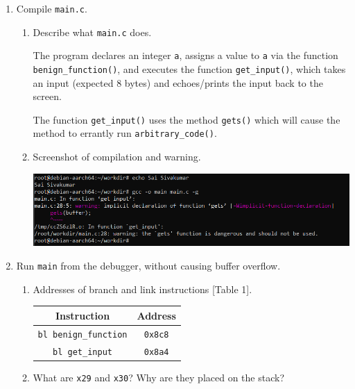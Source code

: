 \documentclass[11pt]{article}
\newcommand{\fn}[1]{\texttt{#1}}
\begin{document}
\begin{enumerate}[left = \parindent, label=\textbf{Task \arabic* -}]
    \item Compile \fn{main.c}. \begin{enumerate}
        \item Describe what \fn{main.c} does.
        
        The program declares an integer \fn a, assigns a value to \fn a via the function \fn{benign\_function()}, and executes the function \fn{get\_input()}, which takes an input (expected $8$ bytes) and echoes/prints the input back to the screen.

        The function \fn{get\_input()} uses the method \fn{gets()} which will cause the method to errantly run \fn{arbitrary\_code()}.
        \item Screenshot of compilation and warning.
        
        \begin{center}
            \includegraphics[scale=.85]{compile warning.png}
        \end{center}
    \end{enumerate}
    \item Run \fn{main} from the debugger, without causing buffer overflow. \begin{enumerate}
        \item Addresses of branch and link instructions [Table 1].
        \begin{center}
            \begin{tabular}[h]{|c|c|}
                \hline\textbf{Instruction} & \textbf{Address} \\
                \hline\fn{bl benign\_function} & \fn{0x8c8}\\
                \hline\fn{bl get\_input} & \fn{0x8a4}\\
                \hline
            \end{tabular}
        \end{center}
        \item What are \fn{x29} and \fn{x30}? Why are they placed on the stack?
        

\end{enumerate}
\end{enumerate}
\end{document}
